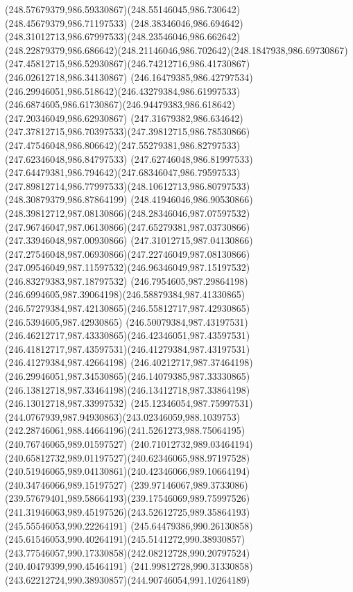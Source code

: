 {{		\curveto(248.57679379,986.59330867)(248.55146045,986.730642)(248.45679379,986.71197533)
		\curveto(248.38346046,986.694642)(248.31012713,986.67997533)(248.23546046,986.662642)
		\curveto(248.22879379,986.686642)(248.21146046,986.702642)(248.1847938,986.69730867)
		\curveto(247.45812715,986.52930867)(246.74212716,986.41730867)(246.02612718,986.34130867)
		\curveto(246.16479385,986.42797534)(246.29946051,986.518642)(246.43279384,986.61997533)
		\curveto(246.6874605,986.61730867)(246.94479383,986.618642)(247.20346049,986.62930867)
		\curveto(247.31679382,986.634642)(247.37812715,986.70397533)(247.39812715,986.78530866)
		\curveto(247.47546048,986.806642)(247.55279381,986.82797533)(247.62346048,986.84797533)
		\curveto(247.62746048,986.81997533)(247.64479381,986.794642)(247.68346047,986.79597533)
		\curveto(247.89812714,986.77997533)(248.10612713,986.80797533)(248.30879379,986.87864199)
		\curveto(248.41946046,986.90530866)(248.39812712,987.08130866)(248.28346046,987.07597532)
		\curveto(247.96746047,987.06130866)(247.65279381,987.03730866)(247.33946048,987.00930866)
		\curveto(247.31012715,987.04130866)(247.27546048,987.06930866)(247.22746049,987.08130866)
		\curveto(247.09546049,987.11597532)(246.96346049,987.15197532)(246.83279383,987.18797532)
		\curveto(246.7954605,987.29864198)(246.6994605,987.39064198)(246.58879384,987.41330865)
		\curveto(246.57279384,987.42130865)(246.55812717,987.42930865)(246.5394605,987.42930865)
		\curveto(246.50079384,987.43197531)(246.46212717,987.43330865)(246.42346051,987.43597531)
		\curveto(246.41812717,987.43597531)(246.41279384,987.43197531)(246.41279384,987.42664198)
		\curveto(246.40212717,987.37464198)(246.29946051,987.34530865)(246.14079385,987.33330865)
		\curveto(246.13812718,987.33464198)(246.13412718,987.33864198)(246.13012718,987.33997532)
		\curveto(245.12346054,987.75997531)(244.0767939,987.94930863)(243.02346059,988.1039753)
		\curveto(242.28746061,988.44664196)(241.5261273,988.75064195)(240.76746065,989.01597527)
		\curveto(240.71012732,989.03464194)(240.65812732,989.01197527)(240.62346065,988.97197528)
		\curveto(240.51946065,989.04130861)(240.42346066,989.10664194)(240.34746066,989.15197527)
		\curveto(239.97146067,989.3733086)(239.57679401,989.58664193)(239.17546069,989.75997526)
		\curveto(241.31946063,989.45197526)(243.52612725,989.35864193)(245.55546053,990.22264191)
		\curveto(245.64479386,990.26130858)(245.61546053,990.40264191)(245.5141272,990.38930857)
		\curveto(243.77546057,990.17330858)(242.08212728,990.20797524)(240.40479399,990.45464191)
		\curveto(241.99812728,990.31330858)(243.62212724,990.38930857)(244.90746054,991.10264189)
}}
